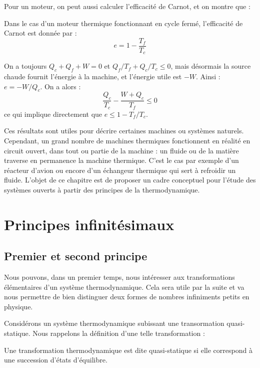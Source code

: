 \documentclass[11pt,fleqn]{book} %
\begin{document}
Pour un moteur, on peut aussi calculer l'efficacité de Carnot, et on montre que :
\begin{proposition}
Dans le cas d'un moteur thermique fonctionnant en cycle fermé, l'efficacité de Carnot est donnée par :
\begin{equation}
    e = 1 - \frac{T_f}{T_c}
\end{equation}
\end{proposition}
\begin{demonstration}
On a toujours $Q_c+Q_f+W=0$ et $Q_f/T_f + Q_c/T_c \le 0$, mais désormais la source chaude fournit l'énergie à la machine, et l'énergie utile est $-W$. Ainsi :
$e = - W/Q_c$.
On a alors :
\begin{equation}
    \frac{Q_c}{T_c} - \frac{W+Q_c}{T_f} \le 0
\end{equation}
ce qui implique directement que $e \le 1-T_f/T_c$.
\end{demonstration}

Ces résultats sont utiles pour décrire certaines machines ou systèmes naturels. Cependant, un grand nombre de machines thermiques fonctionnent en réalité en circuit ouvert, dans tout ou partie de la machine : un fluide ou de la matière traverse en permanence la machine thermique. C'est le cas par exemple d'un réacteur d'avion ou encore d'un échangeur thermique qui sert à refroidir un fluide. L'objet de ce chapitre est de proposer un cadre conceptuel pour l'étude des systèmes ouverts à partir des principes de la thermodynamique.

\section{Principes infinitésimaux}

\subsection{Premier et second principe}

Nous pouvons, dans un premier temps, nous intéresser aux transformations élémentaires d'un système thermodynamique. Cela sera utile par la suite et va nous permettre de bien distinguer deux formes de nombres infiniments petits en physique.

Considérons un système thermodynamique subissant une transormation quasi-statique. Nous rappelons la définition d'une telle transformation :
\begin{definition}
    Une transformation thermodynamique est dite quasi-statique si elle correspond à une succession d'états d'équilibre.
\end{definition}
\end{document}
